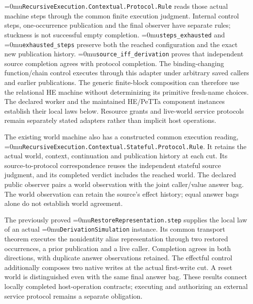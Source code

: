 \documentclass[11pt,a4paper]{article}
\newcommand{\name}[1]{\textup{\Urlmuskip=0mu\relax\nolinkurl{#1}}}
\begin{document}
\name{RecursiveExecution.Contextual.Protocol.Rule} reads those actual machine
steps through the common finite execution judgment. Internal control steps,
one-occurrence publication and the final observer have separate rules;
stuckness is not successful empty completion. \name{steps_exhausted} and
\name{exhausted_steps} preserve both the reached configuration and the exact
new publication history. \name{source_iff_derivation} proves that independent
source completion agrees with protocol completion. The binding-changing
function/chain control executes through this adapter under arbitrary saved
callers and earlier publications. The generic finite-block composition can
therefore use the relational HE machine without determinizing its primitive
fresh-name choices. The declared worker and the maintained HE/PeTTa component
instances establish their local laws below. Resource grants and live-world
service protocols remain separately stated adapters rather than implicit host
operations.

The existing world machine also has a constructed common execution reading,
\name{RecursiveExecution.Contextual.Stateful.Protocol.Rule}. It retains the
actual world, context, continuation and publication history at each cut.
Its source-to-protocol correspondence reuses the independent stateful source
judgment, and its completed verdict includes the reached world. The declared
public observer pairs a world observation with the joint caller/value answer
bag. The world observation can retain the source's effect history; equal
answer bags alone do not establish world agreement.

The previously proved \name{RestoreRepresentation.step} supplies the local
law of an actual \name{DerivationSimulation} instance. Its common transport
theorem executes the nonidentity alias representation through two restored
occurrences, a prior publication and a live caller. Completion agrees in
both directions, with duplicate answer observations retained. The effectful
control additionally composes two native writes at the actual first-write
cut. A reset world is distinguished even with the same final answer bag.
These results connect locally completed host-operation contracts; executing
and authorizing an external service protocol remains a separate obligation.
\end{document}
